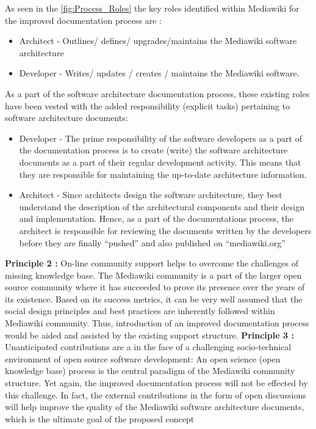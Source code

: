 As seen in the \autoref{fig:Process_Roles} the key roles identified within Mediawiki for the improved documentation process are :
\begin{itemize}
\item Architect - Outlines/ defines/ upgrades/maintains the Mediawiki software architecture
\item Developer - Writes/ updates / creates / maintains the Mediawiki software.
\end{itemize}
As a part of the software architecture documentation process, these existing roles have been vested with the added responsibility (explicit tasks) pertaining to software architecture documents:
\begin{itemize}
\item Developer - The prime responsibility of the software developers as a part of the documentation process is to create (write) the software architecture documents as a part of their regular development activity. This means that they are responsible for maintaining the up-to-date architecture information.
\item Architect - Since architects design the software architecture, they best understand the description of the architectural components and their design and implementation. Hence, as a part of the documentations process, the architect is responsible for reviewing the documents written by the developers before they are finally \enquote{pushed} and also published on \enquote{mediawiki.org}
\end{itemize}

\textbf{Principle 2 : }On-line community support helps to overcome the challenges of missing knowledge base.  
\indent The Mediawiki community is a part of the larger open source community where it has succeeded to prove its presence over the years of its existence. Based on its success metrics, it can be very well assumed that the social design principles and best practices are inherently followed within Mediawiki community. Thus, introduction of an improved documentation process would be aided and assisted by the existing support structure.
\newline \newline
\textbf{Principle 3 : } Unanticipated contributions are a in the face of a challenging socio-technical environment of open source software development:
\indent An open science (open knowledge base) process is the central paradigm of the Mediawiki community structure. Yet again, the improved documentation process will not be effected by this challenge. In fact, the external contributions in the form of open discussions will help improve the quality of the Mediawiki software architecture documents, which is the ultimate goal of the proposed concept

